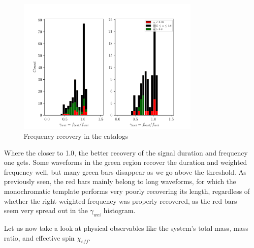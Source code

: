 \begin{figure}[hbt!]
\begin{center}
\includegraphics[width=0.8\textwidth, angle=0]{images/Data_analysis/results/alpha_gammahist.pdf}
\caption{Frequency recovery in the catalogs}
\label{aghist}
\end{center}
\end{figure}
\FloatBarrier

Where the closer to 1.0, the better recovery of the signal duration and frequency one gets. Some waveforms in the green region recover the duration and weighted frequency well, but many green bars disappear as we go above the threshold. As previously seen, the red bars mainly belong to long waveforms, for which the monochromatic template performs very poorly recovering its length, regardless of whether the right weighted frequency was properly recovered, as the red bars seem very spread out in the $\gamma_{wei}$ histogram. 

\newpage

Let us now take a look at physical observables like the system's total mass, mass ratio, and effective spin $\chi_{eff}$.  

